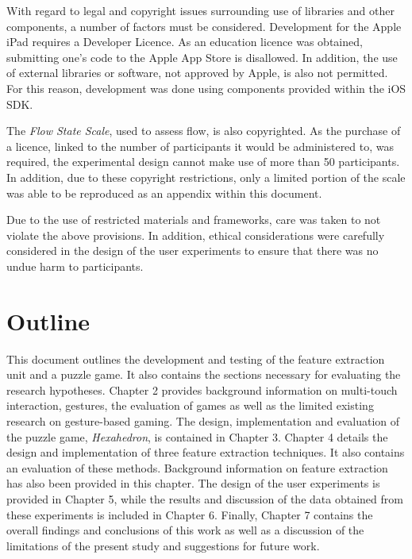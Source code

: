 With regard to legal and copyright issues surrounding use of libraries and other components, a number of factors must be considered. Development for the Apple iPad requires a Developer Licence. As an education licence was obtained, submitting one's code to the Apple App Store is disallowed. In addition, the use of external libraries or software, not approved by Apple, is also not permitted. For this reason, development was done using components provided within the iOS SDK. 

The \emph{Flow State Scale}, used to assess flow, is also copyrighted. As the purchase of a licence, linked to the number of participants it would be administered to, was required, the experimental design cannot make use of more than 50 participants. In addition, due to these copyright restrictions, only a limited portion of the scale was able to be reproduced as an appendix within this document.

Due to the use of restricted materials and frameworks, care was taken to not violate the above provisions. In addition, ethical considerations were carefully considered in the design of the user experiments to ensure that there was no undue harm to participants.

\section{Outline}
This document outlines the development and testing of the feature extraction unit and a puzzle game. It also contains the sections necessary for evaluating the research hypotheses. Chapter 2 provides background information on multi-touch interaction, gestures, the evaluation of games as well as the limited existing research on gesture-based gaming. The design, implementation and evaluation of the puzzle game, \emph{Hexahedron}, is contained in Chapter 3. Chapter 4 details the design and implementation of three feature extraction techniques. It also contains an evaluation of these methods. Background information on feature extraction has also been provided in this chapter. The design of the user experiments is provided in Chapter 5, while the results and discussion of the data obtained from these experiments is included in Chapter 6. Finally, Chapter 7 contains the overall findings and conclusions of this work as well as a discussion of the limitations of the present study and suggestions for future work.






